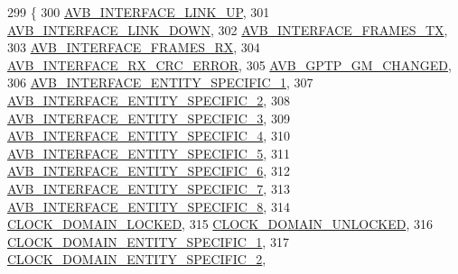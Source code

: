 \begin{DoxyCode}
299 \{
300     \hyperlink{namespaceavdecc__lib_a831be56dba8ac423258a9374a1202df4ace6e5d91922a5894bb43065219ae3e5d}{AVB\_INTERFACE\_LINK\_UP},
301     \hyperlink{namespaceavdecc__lib_a831be56dba8ac423258a9374a1202df4aa789342277252d530b88a3d6f0330ba1}{AVB\_INTERFACE\_LINK\_DOWN},
302     \hyperlink{namespaceavdecc__lib_a831be56dba8ac423258a9374a1202df4a1952a099e63d03a7dcb1d6e3b0ea50af}{AVB\_INTERFACE\_FRAMES\_TX},
303     \hyperlink{namespaceavdecc__lib_a831be56dba8ac423258a9374a1202df4a521047f1a79ce7b8ae4e00350d4ec081}{AVB\_INTERFACE\_FRAMES\_RX},
304     \hyperlink{namespaceavdecc__lib_a831be56dba8ac423258a9374a1202df4a605ffe6c6d52bf64afcd06550ecd1e96}{AVB\_INTERFACE\_RX\_CRC\_ERROR},
305     \hyperlink{namespaceavdecc__lib_a831be56dba8ac423258a9374a1202df4a0267d3d1b1c33c2f0e0b58de3ef3fb94}{AVB\_GPTP\_GM\_CHANGED},
306     \hyperlink{namespaceavdecc__lib_a831be56dba8ac423258a9374a1202df4a17d9257c93fbea636945c338b5097747}{AVB\_INTERFACE\_ENTITY\_SPECIFIC\_1},
307     \hyperlink{namespaceavdecc__lib_a831be56dba8ac423258a9374a1202df4ae6b8d362db4024237a61fa98cdf4c774}{AVB\_INTERFACE\_ENTITY\_SPECIFIC\_2},
308     \hyperlink{namespaceavdecc__lib_a831be56dba8ac423258a9374a1202df4a0aea0a67ee79c7988f4f71f580d7a6aa}{AVB\_INTERFACE\_ENTITY\_SPECIFIC\_3},
309     \hyperlink{namespaceavdecc__lib_a831be56dba8ac423258a9374a1202df4afe177be48bad4bb43a4274aac2c82d31}{AVB\_INTERFACE\_ENTITY\_SPECIFIC\_4},
310     \hyperlink{namespaceavdecc__lib_a831be56dba8ac423258a9374a1202df4a5a5d8005f1eb8a17fe9cfbfc6d64de87}{AVB\_INTERFACE\_ENTITY\_SPECIFIC\_5},
311     \hyperlink{namespaceavdecc__lib_a831be56dba8ac423258a9374a1202df4a31372583d9045ab48cdd6d6168054d21}{AVB\_INTERFACE\_ENTITY\_SPECIFIC\_6},
312     \hyperlink{namespaceavdecc__lib_a831be56dba8ac423258a9374a1202df4a28b9f22c52acf00333c4567e10cd9e4f}{AVB\_INTERFACE\_ENTITY\_SPECIFIC\_7},
313     \hyperlink{namespaceavdecc__lib_a831be56dba8ac423258a9374a1202df4ad3a20ab7393efbfa4b0d4583589ac23a}{AVB\_INTERFACE\_ENTITY\_SPECIFIC\_8},
314     \hyperlink{namespaceavdecc__lib_a831be56dba8ac423258a9374a1202df4a956e33777cd5b1499e9c1e3aba85afbd}{CLOCK\_DOMAIN\_LOCKED},
315     \hyperlink{namespaceavdecc__lib_a831be56dba8ac423258a9374a1202df4ab363d627741d74c605ed201dd91ce78e}{CLOCK\_DOMAIN\_UNLOCKED},
316     \hyperlink{namespaceavdecc__lib_a831be56dba8ac423258a9374a1202df4a952042e29f7ffa7e4dbb7d4b5f4b1432}{CLOCK\_DOMAIN\_ENTITY\_SPECIFIC\_1},
317     \hyperlink{namespaceavdecc__lib_a831be56dba8ac423258a9374a1202df4a4ae2ebfc7d4f7261625e2af36b26f4e7}{CLOCK\_DOMAIN\_ENTITY\_SPECIFIC\_2},

\end{DoxyCode}
